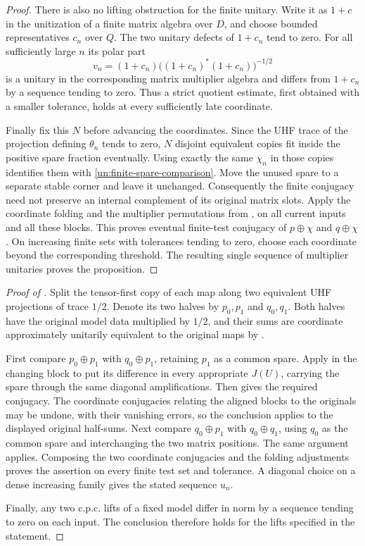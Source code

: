 \begin{proof}
There is also no lifting obstruction for the finite unitary.
Write it as $1+c$ in the unitization of a finite matrix algebra
over $D$, and choose bounded representatives $c_n$ over $Q$.
The two unitary defects of $1+c_n$ tend to zero.  For all
sufficiently large $n$ its polar part
\[
 v_n=(1+c_n)\bigl((1+c_n)^*(1+c_n)\bigr)^{-1/2}
\]
is a unitary in the corresponding matrix multiplier algebra and
differs from $1+c_n$ by a sequence tending to zero.  Thus a strict
quotient estimate, first obtained with a smaller tolerance, holds
at every sufficiently late coordinate.

Finally fix this $N$ before advancing the coordinates.  Since the
UHF trace of the projection defining $\theta_n$ tends to zero,
$N$ disjoint equivalent copies fit inside the positive spare
fraction eventually.  Using exactly the same $\chi_n$ in those
copies identifies them with \eqref{un:finite-spare-comparison}.
Move the unused spare to a separate stable corner and leave it
unchanged.  Consequently the finite conjugacy need not preserve
an internal complement of its original matrix slots.  Apply the
coordinate folding and the multiplier permutations from
, on all current inputs and all these blocks.
This proves eventual finite-test conjugacy of $p\oplus\chi$ and
$q\oplus\chi$.  On increasing finite sets with tolerances tending
to zero, choose each coordinate beyond the corresponding
threshold.  The resulting single sequence of multiplier unitaries
proves the proposition.
\end{proof}

\begin{proof}[Proof of ]
Split the tensor-first copy of each map along two equivalent UHF
projections of trace $1/2$.  Denote its two halves by $p_0,p_1$
and $q_0,q_1$.  Both halves have the original model data multiplied
by $1/2$, and their sums are coordinate approximately unitarily
equivalent to the original maps by .

First compare $p_0\oplus p_1$ with $q_0\oplus p_1$, retaining
$p_1$ as a common spare.  Apply  in the changing
block to put its difference in every appropriate $J(U)$, carrying
the spare through the same diagonal amplifications.  Then
 gives the required conjugacy.  The coordinate
conjugacies relating the aligned blocks to the originals may be
undone, with their vanishing errors, so the conclusion applies
to the displayed original half-sums.  Next compare
$q_0\oplus p_1$ with $q_0\oplus q_1$, using $q_0$ as the common
spare and interchanging the two matrix positions.  The same
argument applies.  Composing the two coordinate conjugacies and
the folding adjustments proves the assertion on every finite
test set and tolerance.  A diagonal choice on a dense increasing
family gives the stated sequence $u_n$.

Finally, any two c.p.c. lifts of a fixed model differ in norm by a
sequence tending to zero on each input.  The conclusion therefore
holds for the lifts specified in the statement.
\end{proof}
